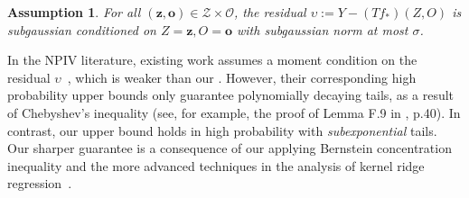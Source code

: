 \documentclass[11pt]{article}
\newcommand{\bz}{\mathbf z}
\newcommand{\bo}{\mathbf o}
\newcommand{\calZ}{\mathcal{Z}}
\newcommand{\calO}{\mathcal{O}}
\newcommand{\0}{\mathbf{0}}
\newtheorem{ass}{Assumption}[section]
\begin{document}
\begin{ass}
\label{ass:subgaussian}
For all $(\bz,\bo)\in \calZ\times \calO$, the residual $\upsilon:= Y - (Tf_{\ast})(Z,O)$ is subgaussian conditioned on $Z=\bz,O=\bo$ with subgaussian norm at most $\sigma$. 
\end{ass}
In the NPIV literature, existing work assumes a moment condition on the residual $\upsilon$~\citep{blundell2007semi,HallHorowitz2005,Chen_2018, chen2011rate}, which is weaker than our . However, their corresponding high probability upper bounds only guarantee polynomially decaying tails, as a result of Chebyshev’s inequality (see, for example, the proof of Lemma F.9 in \citet{Chen_2018}, p.40).
In contrast, our upper bound holds in high probability with \emph{subexponential} tails. Our sharper guarantee is a consequence of our applying Bernstein concentration inequality and the more advanced techniques in the analysis of kernel ridge regression~\citep{fischer2020sobolev, eberts2013optimal, hang2021optimal}.   
\end{document}
